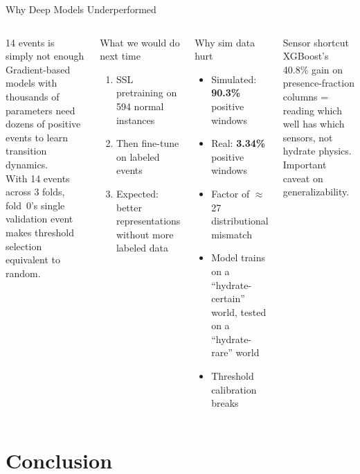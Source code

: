 \documentclass[aspectratio=169,10pt]{beamer}
\begin{document}
\begin{frame}{Why Deep Models Underperformed}
  \begin{columns}
      \begin{alertblock}{14 events is simply not enough}
        Gradient-based models with thousands of parameters need dozens of positive events to learn transition dynamics.\\
        With 14 events across 3 folds, fold~0's single validation event makes threshold selection equivalent to random.
      \end{alertblock}
      \begin{block}{What we would do next time}
        \begin{enumerate}
          \item SSL pretraining on 594 normal instances
          \item Then fine-tune on labeled events
          \item Expected: better representations without more labeled data
        \end{enumerate}
      \end{block}
      \begin{block}{Why sim data hurt}
        \begin{itemize}
          \item Simulated: \textbf{90.3\%} positive windows
          \item Real: \textbf{3.34\%} positive windows
          \item Factor of $\approx$27 distributional mismatch
          \item Model trains on a ``hydrate-certain'' world, tested on a ``hydrate-rare'' world
          \item Threshold calibration breaks
        \end{itemize}
      \end{block}
      \begin{block}{Sensor shortcut}
        XGBoost's 40.8\% gain on presence-fraction columns = reading which well has which sensors, not hydrate physics.\\
        Important caveat on generalizability.
      \end{block}
  \end{columns}
\end{frame}

\section{Conclusion}
\end{document}
